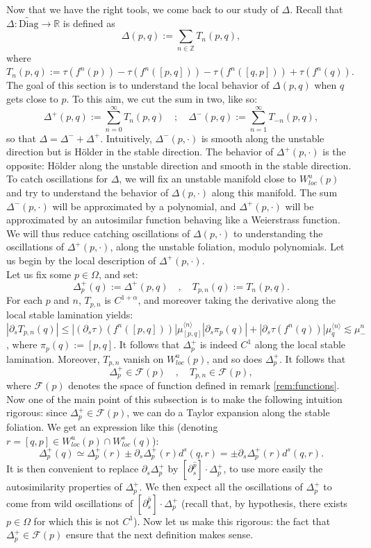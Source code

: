 \documentclass[a4paper]{article}
\theoremstyle{definition}
\begin{document}
Now that we have the right tools, we come back to our study of $\Delta$. Recall that $\Delta : \widetilde{\text{Diag}} \rightarrow \mathbb{R}$ is defined as
$$\Delta(p,q) := \sum_{n \in \mathbb{Z}} T_n(p,q) ,$$
where $T_n(p,q) := \tau(f^n(p)) - \tau(f^n([p,q])) - \tau(f^n([q,p])) + \tau(f^n(q))$. The goal of this section is to understand the local behavior of $\Delta(p,q)$ when $q$ gets close to $p$. To this aim, we cut the sum in two, like so: 
$$ \Delta^+(p,q) := \sum_{n=0}^\infty T_n(p,q) \quad ; \quad \Delta^-(p,q) := \sum_{n=1}^\infty T_{-n}(p,q),$$
so that $\Delta = \Delta^- + \Delta^+$. Intuitively, $\Delta^-(p,\cdot)$ is smooth along the unstable direction but is Hölder in the stable direction. The behavior of $\Delta^+(p,\cdot)$ is the opposite: Hölder along the unstable direction and smooth in the stable direction. To catch oscillations for $\Delta$, we will fix an unstable manifold close to $W^u_{loc}(p)$ and try to understand the behavior of $\Delta(p,\cdot)$ along this manifold. The sum $\Delta^-(p,\cdot)$ will be approximated by a polynomial, and $\Delta^+(p,\cdot)$ will be approximated by an autosimilar function behaving like a Weierstrass function. We will thus reduce catching oscillations of $\Delta(p,\cdot)$ to understanding the oscillations of $\Delta^+(p,\cdot)$, along the unstable foliation, modulo polynomials. Let us begin by the local description of $\Delta^+(p,\cdot)$.\\

Let us fix some $p \in \Omega$, and set:
$$ \Delta_p^+(q) := \Delta^{+}(p,q) \quad , \quad T_{p,n}(q) := T_n(p,q) .$$
For each $p$ and $n$, $T_{p,n}$ is $C^{1+\alpha}$, and moreover taking the derivative along the local stable lamination yields: $|\partial_s T_{p,n}(q)| \leq |(\partial_s \tau)( f^n([p,q]))| \mu_{[p,q]}^{\langle n\rangle} |\partial_s \pi_p(q)| + |\partial_s \tau(f^n(q))| \mu_q^{\langle n \rangle} \lesssim \mu_-^n$, where $\pi_p(q) := [p,q]$. It follows that $\Delta_{p}^+$ is indeed $C^{1}$ along the local stable lamination. Moreover, $T_{p,n}$ vanish on $W^u_{loc}(p)$, and so does $\Delta_p^+$. It follows that
$$ \Delta_p^{+} \in \mathcal{F}(p) \quad, \quad T_{p,n} \in \mathcal{F}(p) ,$$
where $\mathcal{F}(p)$ denotes the space of function defined in remark \ref{rem:functions}. Now one of the main point of this subsection is to make the following intuition rigorous: since $\Delta_p^+ \in \mathcal{F}(p)$, we can do a Taylor expansion along the stable foliation. We get an expression like this (denoting $r=[q,p] \in W^u_{loc}(p) \cap W^s_{loc}(q)$):
$$ \Delta_p^+(q) \simeq  \Delta_p^+(r) \pm \partial_s \Delta_p^+(r) d^s(q,r) = \pm \partial_s \Delta_p^+(r) d^s(q,r). $$
It is then convenient to replace $\partial_s \Delta_p^+$ by $[\partial_s^{\widehat{p}}] \cdot \Delta_{p}^+$, to use more easily the autosimilarity properties of $\Delta_p^+$. We then expect all the oscillations of $\Delta_p^+$ to come from wild oscillations of $[\partial_s^{\widehat{p}}] \cdot \Delta_{p}^+$ (recall that, by hypothesis, there exists $p \in \Omega$ for which this is not $C^1$). Now let us make this rigorous: the fact that $\Delta_p^+ \in \mathcal{F}(p)$ ensure that the next definition makes sense.
\end{document}
